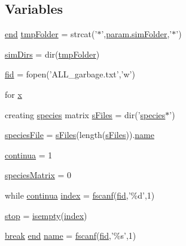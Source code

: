 \subsection*{Variables}
\begin{DoxyCompactItemize}
\item 
\hyperlink{a00025_afb358f48b1646c750fb9da6c6585be2b}{end} \hyperlink{a00027_ad509473eed851f9f5ff4157c02ec8618}{tmp\-Folder} = strcat('$\ast$',\hyperlink{a00032_aa671e3345005bd599e662bcaa115b18a}{param.\-sim\-Folder},'$\ast$')
\item 
\hyperlink{a00027_aae5035eb84b89176ed5b06e136325eff}{sim\-Dirs} = dir(\hyperlink{a00029_ad509473eed851f9f5ff4157c02ec8618}{tmp\-Folder})
\item 
\hyperlink{a00027_ae9011d40c6f13e68e6f07156e0da7c5d}{fid} = fopen('A\-L\-L\-\_\-garbage.\-txt','w')
\item 
for \hyperlink{a00027_a7265972fe485274cfff77a9bb07b8fce}{x}
\item 
creating \hyperlink{a00022}{species} matrix \hyperlink{a00027_a0cf551ea63e8b67362ae2ab776072d1f}{s\-Files} = dir('\hyperlink{a00022}{species}$\ast$')
\item 
\hyperlink{a00027_a7da0c82834970c5f3c3d9224ab832577}{species\-File} = \hyperlink{a00027_a0cf551ea63e8b67362ae2ab776072d1f}{s\-Files}(length(\hyperlink{a00027_a0cf551ea63e8b67362ae2ab776072d1f}{s\-Files})).\hyperlink{a00027_abbf559a76fab59203496b0847ab9502a}{name}
\item 
\hyperlink{a00027_a9c951ebd5bc3f1adce943bee1255f4d6}{continua} = 1
\item 
\hyperlink{a00027_aaeeccb9f4fc7b14ac6b4810a4bf9f71e}{species\-Matrix} = 0
\item 
while \hyperlink{a00030_a9c951ebd5bc3f1adce943bee1255f4d6}{continua} \hyperlink{a00027_a0cd6a44ffb07342cbc7e5ac33bfc9495}{index} = \hyperlink{a00025_a028ac102a731e62fb0a7439381f566c1}{fscanf}(\hyperlink{a00031_ae9011d40c6f13e68e6f07156e0da7c5d}{fid},'\%d',1)
\item 
\hyperlink{a00027_a6bd08e37edf4151f5f6d1fc27a6f227a}{stop} = \hyperlink{a00025_ac10445404f4b83302522defb59e25ef7}{isempty}(\hyperlink{a00060_a0cd6a44ffb07342cbc7e5ac33bfc9495}{index})
\item 
\hyperlink{a00029_a91cf6fbebedd86150a36e5ac3d5d3bfc}{break} \hyperlink{a00025_afb358f48b1646c750fb9da6c6585be2b}{end} \hyperlink{a00027_abbf559a76fab59203496b0847ab9502a}{name} = \hyperlink{a00025_a028ac102a731e62fb0a7439381f566c1}{fscanf}(\hyperlink{a00031_ae9011d40c6f13e68e6f07156e0da7c5d}{fid},'\%s',1)
\item 

\end{DoxyCompactItemize}
